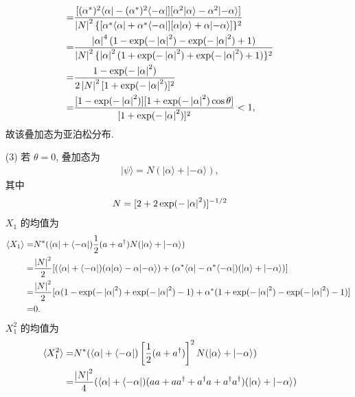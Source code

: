 \documentclass{assignment}
\begin{document}
\begin{sol}
\begin{itemize}
\begin{align}
            \notag=&\frac{[(\alpha^*)^2\langle\alpha\rvert-(\alpha^*)^2\langle-\alpha\rvert][\alpha^2\lvert\alpha\rangle-\alpha^2\lvert-\alpha\rangle]}{\left\lvert N\right\rvert^2\{[\alpha^*\langle\alpha\rvert+\alpha^*\langle-\alpha\rvert][\alpha\lvert\alpha\rangle+\alpha\lvert-\alpha\rangle]\}^2}\\
            \notag=&\frac{\left\lvert\alpha\right\rvert^4(1-\exp(-\left\lvert\alpha\right\rvert^2)-\exp(-\left\lvert\alpha\right\rvert^2)+1)}{\left\lvert N\right\rvert^2\{\left\lvert\alpha\right\rvert^2(1+\exp(-\left\lvert\alpha\right\rvert^2)+\exp(-\left\lvert\alpha\right\rvert^2)+1)\}^2}\\
            \notag=&\frac{1-\exp(-\left\lvert\alpha\right\rvert^2)}{2\left\lvert N\right\rvert^2[1+\exp(-\left\lvert\alpha\right\rvert^2)]^2}\\
            =&\frac{[1-\exp(-\left\lvert\alpha\right\rvert^2)][1+\exp(-\left\lvert\alpha\right\rvert^2)\cos\theta]}{[1+\exp(-\left\lvert\alpha\right\rvert^2)]^2}<1,
        \end{align}
        故该叠加态为亚泊松分布.
        \item[(3)] 若 $\theta=0$, 叠加态为
        \begin{align}
            \lvert\psi\rangle=N(\lvert\alpha\rangle+\lvert-\alpha\rangle),
        \end{align}
        其中
        \begin{align}
            N=[2+2\exp(-\left\lvert\alpha\right\rvert^2)]^{-1/2}
        \end{align}
        $X_1$ 的均值为
        \begin{align}
            \notag\langle X_1\rangle=&N^*(\langle\alpha\rvert+\langle-\alpha\rvert)\frac{1}{2}(a+a^{\dagger})N(\lvert\alpha\rangle+\lvert-\alpha\rangle)\\
            \notag=&\frac{\left\lvert N\right\rvert^2}{2}[(\langle\alpha\rvert+\langle-\alpha\rvert)(\alpha\lvert\alpha\rangle-\alpha\lvert-\alpha\rangle)+(\alpha^*\langle\alpha\rvert-\alpha^*\langle-\alpha\rvert)(\lvert\alpha\rangle+\lvert-\alpha\rangle)]\\
            \notag=&\frac{\left\lvert N\right\rvert^2}{2}[\alpha(1-\exp(-\left\lvert\alpha\right\rvert^2)+\exp(-\left\lvert\alpha\right\rvert^2)-1)+\alpha^*(1+\exp(-\left\lvert\alpha\right\rvert^2)-\exp(-\left\lvert\alpha\right\rvert^2)-1)]\\
            =&0.
        \end{align}
        $X_1^2$ 的均值为
        \begin{align}
            \notag\langle X_1^2\rangle=&N^*(\langle\alpha\rvert+\langle-\alpha\rvert)\left[\frac{1}{2}(a+a^{\dagger})\right]^2N(\lvert\alpha\rangle+\lvert-\alpha\rangle)\\
            \notag=&\frac{\abs{N}^2}{4}(\langle\alpha\rvert+\langle-\alpha\rvert)(aa+aa^{\dagger}+a^{\dagger}a+a^{\dagger}a^{\dagger})(\lvert\alpha\rangle+\lvert-\alpha\rangle)\\

\end{align}
\end{itemize}
\end{sol}
\end{document}
